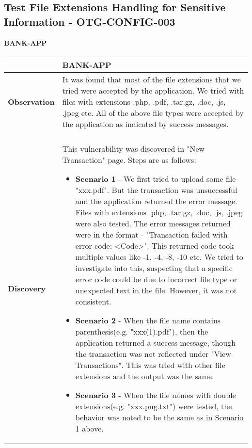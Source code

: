 \subsection{Test File Extensions Handling for Sensitive Information - OTG-CONFIG-003} \label{OTG-CONFIG-003}
\paragraph{BANK-APP} \mbox{}
\begin{longtable*}{p{.20\textwidth} | p{.80\textwidth}}
    \hline
    & \textbf{BANK-APP} \\
    \hline
    \textbf{Observation} &
      It was found that most of the file extensions that we tried were accepted by the application. We tried with files with extensions .php, .pdf, .tar.gz, .doc, .js, .jpeg etc. All of the above file types were accepted by the application as indicated by success messages.
    \\\\
    \textbf{Discovery} &
        This vulnerability was discovered in "New Transaction" page. Steps are as follows:
        \begin{itemize}
         \item \textbf{Scenario 1} - We first tried to upload some file "xxx.pdf". But the transaction was unsuccessful and the application returned the error message. Files with extensions .php, .tar.gz, .doc, .js, .jpeg were also tested.
         The error messages returned were in the format - "Transaction failed with error code: <Code>". This returned code took multiple values like -1, -4, -8, -10 etc. We tried to investigate into this, suspecting that a specific error code could be due to incorrect file type or unexpected text in the file. However, it was not consistent. 

         \item \textbf{Scenario 2} - When the file name contains parenthesis(e.g. "xxx(1).pdf"), then the application returned a success message, though the transaction was not reflected under "View Transactions". This was tried with other file extensions and the output was the same.

         \item \textbf{Scenario 3} - When the file names with double extensions(e.g. "xxx.png.txt") were tested, the behavior was noted to be the same as in Scenario 1 above.
        \end{itemize}


\end{longtable*}
